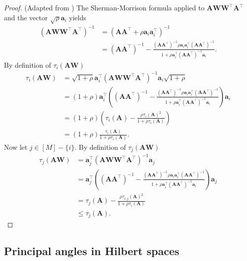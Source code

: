 \documentclass[twoside,11pt]{book}
\numberwithin{theorem}{chapter}
\numberwithin{definition}{chapter}
\numberwithin{proposition}{chapter}
\numberwithin{corollary}{chapter}
\numberwithin{example}{chapter}
\numberwithin{lemma}{chapter}
\numberwithin{assumption}{chapter}
\numberwithin{equation}{chapter}
\numberwithin{figure}{chapter}
\DeclareMathOperator{\Tran}{\intercal}
\begin{document}
\begin{proof}(Adapted from \cite{Coh15})
The Sherman-Morrison formula applied to $\bm{A}\bm{W}\bm{W}^{\Tran}\bm{A}^{\Tran}$ and the vector $\sqrt{\rho} \bm{a}_{i}$ yields
\begin{align}
(\bm{A}\bm{W}\bm{W}^{\Tran}\bm{A}^{\Tran})^{-1} &  = (\bm{A}\bm{A}^{\Tran} + \rho \bm{a}_{i}\bm{a}_{i}^{\Tran})^{-1} \\
& = (\bm{A}\bm{A}^{\Tran})^{-1} - \frac{(\bm{A}\bm{A}^{\Tran})^{-1}\rho \bm{a}_{i}\bm{a}_{i}^{\Tran} (\bm{A}\bm{A}^{\Tran})^{-1}}{1+ \rho \bm{a}_{i}^{\Tran}(\bm{A}\bm{A}^{\Tran})^{-1}\bm{a}_{i}}.
\end{align}
By definition of $\tau_{i}(\bm{A}\bm{W})$
\begin{align}
\tau_{i}(\bm{A}\bm{W}) & = \sqrt{1 + \rho} \bm{a}_{i}^{\Tran}(\bm{A}\bm{W}\bm{W}^{\Tran}\bm{A}^{\Tran})^{-1}\bm{a}_{i}\sqrt{1 + \rho}\\
& = (1+\rho)\bm{a}_{i}^{\Tran} \left( (\bm{A}\bm{A}^{\Tran})^{-1} - \frac{(\bm{A}\bm{A}^{\Tran})^{-1}\rho \bm{a}_{i}\bm{a}_{i}^{\Tran} (\bm{A}\bm{A}^{\Tran})^{-1}}{1+ \rho \bm{a}_{i}^{\Tran}(\bm{A}\bm{A}^{\Tran})^{-1}\bm{a}_{i}} \right) \bm{a}_{i} \nonumber\\
& = (1+\rho) \left(\tau_{i}(\bm{A}) - \frac{\rho \tau_{i}(\bm{A})^{2}}{1+\rho \tau_{i}(\bm{A})} \right) \nonumber\\
& = (1+\rho)\frac{\tau_{i}(\bm{A})}{1+\rho \tau_{i}(\bm{A})} \nonumber.
\end{align}
Now let $j \in [M]-\{i\}$. By definition of $\tau_{j}(\bm{A}\bm{W})$
\begin{align}
\tau_{j}(\bm{A}\bm{W}) & =  \bm{a}_{j}^{\Tran}(\bm{A}\bm{W}\bm{W}^{\Tran}\bm{A}^{\Tran})^{-1}\bm{a}_{j}\\
& = \bm{a}_{j}^{\Tran} \left( (\bm{A}\bm{A}^{\Tran})^{-1} - \frac{(\bm{A}\bm{A}^{\Tran})^{-1}\rho \bm{a}_{i}\bm{a}_{i}^{\Tran} (\bm{A}\bm{A}^{\Tran})^{-1}}{1+ \rho \bm{a}_{i}^{\Tran}(\bm{A}\bm{A}^{\Tran})^{-1}\bm{a}_{i}} \right) \bm{a}_{j} \nonumber\\
& =  \tau_{j}(\bm{A}) - \frac{\rho \tau_{i,j}(\bm{A})^{2}}{1+\rho \tau_{i}(\bm{A})} \nonumber\\
& \leq \tau_{j}(\bm{A}) \nonumber.
\end{align}
\end{proof}



\subsection{Principal angles in Hilbert spaces}\label{sec:proof_principal_angles}
\end{document}
